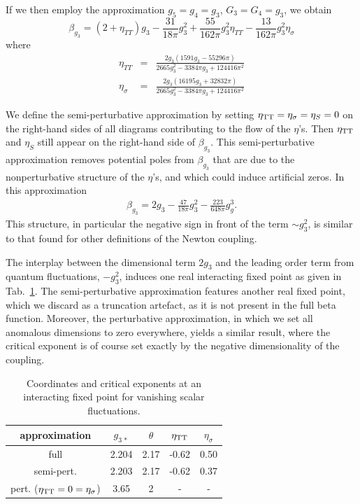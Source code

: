 \documentclass[twocolumn,prd,superscriptaddress,preprintnumbers,amsmath,amssymb,nofootinbib]{revtex4}
\newcommand{\be}{\begin{equation}}
\newcommand{\ee}{\end{equation}}
\newcommand{\bea}{\begin{eqnarray}}
\newcommand{\eea}{\end{eqnarray}}
\begin{document}
If we then employ the approximation $g_5 = g_4 = g_3$, $G_3 = G_4 = g_3$, we obtain 
\be
\beta_{g_3}= (2+\eta_{TT})g_3 
- \frac{31}{18 \pi}g_3^2 
+\frac{55}{162\pi}g_3^2\eta_{TT}
-\frac{13}{162\pi}g_3^2\eta_\sigma
\ee
where
\bea
\eta_{TT}&=&\frac{2g_3(1591 g_3-55296 \pi)}{2665 g_3^2-3384\pi g_3 +124416 \pi^2}
\\
\eta_\sigma&=&\frac{2g_3(16195 g_3+32832 \pi)}{2665 g_3^2-3384\pi g_3 +124416 \pi^2}
\eea


We  define the semi-perturbative approximation by setting $\eta_{\rm TT}= \eta_{\sigma}=\eta_S = 0$ on the right-hand sides of all diagrams contributing to the flow of the $\eta$'s. Then $\eta_{\rm TT}$ and $\eta_S$ still appear on the right-hand side of $\beta_{g_3}$. This semi-perturbative approximation removes potential poles from $\beta_{g_3}$ that are due to the nonperturbative structure of the $\eta$'s, and which could induce artificial zeros.
In this approximation
\bea
\beta_{g_3}= 2g_3 - \frac{47}{18 \pi}g_3^2 
-\frac{223}{648\pi}g_g^3.\label{purgravitysemipertbeta}
\eea
This structure, in particular the negative sign in front of the term $\sim g_3^2$, is similar to that found for other definitions of the Newton coupling.

The interplay between the dimensional term $2g_3$ and the leading order term from quantum fluctuations, $- g_3^2$, induces one real interacting fixed point as given in Tab.~\ref{puregravityFP_table}. The semi-perturbative approximation features another real fixed point, which we discard as a truncation artefact, as it is not present in the full beta function. Moreover, the perturbative approximation, in which we set all anomalous dimensions to zero everywhere, yields a similar result, where the critical exponent is of course set exactly by the negative dimensionality of the coupling. 

\begin{table}[!here]
\begin{tabular}{ccccc}
approximation&$g_{3\,\ast}$& $\theta$& $\eta_{\rm TT}$& $\eta_{\sigma}$\\ \hline \hline
full & 2.204 & 2.17 & -0.62 & 0.50\\ \hline
semi-pert.&2.203 & 2.17 & -0.62 & 0.37 \\ \hline
pert. ($\eta_{\rm TT}=0=\eta_{\sigma}$)& 3.65 & 2 & - & - \\\hline\hline
\end{tabular}
\caption{\label{puregravityFP_table}Coordinates and critical exponents at an interacting fixed point for vanishing scalar fluctuations.}
\end{table} 
\end{document}
